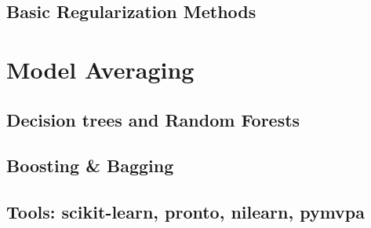\documentclass{beamer}
\begin{document}
    \subsection{Basic Regularization Methods}                                
\section{Model Averaging}
    \subsection{Decision trees and Random Forests}                           
    \subsection{Boosting \& Bagging}                                         
    \subsection{Tools: scikit-learn, pronto, nilearn, pymvpa}                
\end{document}
